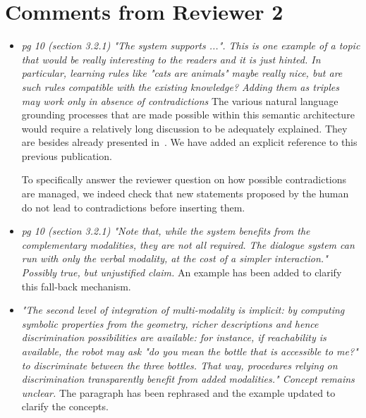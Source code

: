 \documentclass{article}
\begin{document}
\section{Comments from Reviewer 2}

\begin{itemize}
    \item \emph{pg 10 (section 3.2.1)
            "The system supports ...". This is one example of a topic that would
            be really interesting to the readers and it is just hinted. In
            particular, learning rules like "cats are animals" maybe really
            nice, but are such rules compatible with the existing knowledge?
        Adding them as triples may work only in absence of contradictions} The
        various natural language grounding processes that are made possible
        within this semantic
        architecture would require a relatively long discussion to be adequately
        explained. They are besides already presented in~\cite{Lemaignan2011a}.
        We have added an explicit reference to this previous publication.

        To specifically answer the reviewer question on how possible
        contradictions are managed, we indeed check that new statements proposed
        by the human do not lead to contradictions before inserting them.

    \item \emph{pg 10 (section 3.2.1)
            "Note that, while the system benefits from the complementary
            modalities, they are not all
            required. The dialogue system can run with only the verbal modality,
            at the cost of a simpler interaction."
        Possibly true, but unjustified claim.} An example has been added to
        clarify this fall-back mechanism.

    \item \emph{"The second level of integration of multi-modality is implicit:
            by computing symbolic properties 
            from the geometry, richer descriptions and hence discrimination
            possibilities are available: 
            for instance, if reachability is available, the robot may ask "do
            you mean the bottle that is 
            accessible to me?" to discriminate between the three bottles. That
            way, procedures relying on 
            discrimination transparently benefit from added modalities." Concept
        remains unclear.} The paragraph has been rephrased and the example
        updated to clarify the concepts.
\end{itemize}
\end{document}
